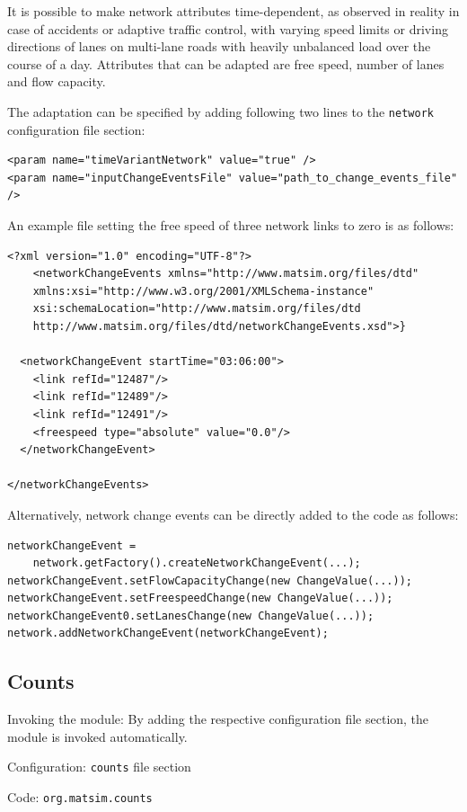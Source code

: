 It is possible to make network attributes time-dependent, as observed in reality in case of accidents or adaptive traffic control, with varying speed limits or driving directions of lanes on multi-lane roads with heavily unbalanced load over the course of a day. Attributes that can be adapted are free speed, number of lanes and flow capacity.

The adaptation can be specified by adding following two lines to the \lstinline|network| configuration file section:
\begin{lstlisting}
<param name="timeVariantNetwork" value="true" />
<param name="inputChangeEventsFile" value="path_to_change_events_file" />
\end{lstlisting}
%
An example file setting the free speed of three network links to zero is as follows:
%
\begin{lstlisting}
<?xml version="1.0" encoding="UTF-8"?>
	<networkChangeEvents xmlns="http://www.matsim.org/files/dtd"
	xmlns:xsi="http://www.w3.org/2001/XMLSchema-instance"
	xsi:schemaLocation="http://www.matsim.org/files/dtd
	http://www.matsim.org/files/dtd/networkChangeEvents.xsd">}

  <networkChangeEvent startTime="03:06:00">
    <link refId="12487"/>
    <link refId="12489"/>
    <link refId="12491"/>
    <freespeed type="absolute" value="0.0"/>
  </networkChangeEvent>

</networkChangeEvents>
\end{lstlisting}
%
Alternatively, network change events can be directly added to the code as follows:
\begin{lstlisting}
networkChangeEvent =
	network.getFactory().createNetworkChangeEvent(...);
networkChangeEvent.setFlowCapacityChange(new ChangeValue(...));
networkChangeEvent.setFreespeedChange(new ChangeValue(...));
networkChangeEvent0.setLanesChange(new ChangeValue(...));
network.addNetworkChangeEvent(networkChangeEvent);
\end{lstlisting}


\subsection{Counts}
\label{sec:counts}
\begin{compactitem}
\item Invoking the module: By adding the respective configuration file section, the module is invoked automatically.
\item Configuration: \lstinline|counts| file section
\item Code: \lstinline|org.matsim.counts|
\end{compactitem}

